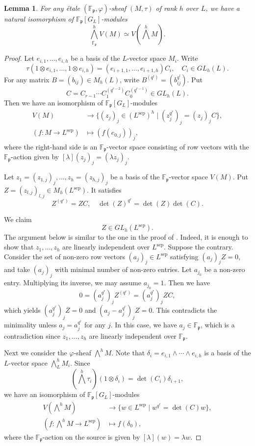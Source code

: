 \documentclass[10pt]{amsart}
\theoremstyle{plain}
\newtheorem{lem}[thm]{Lemma}
\theoremstyle{definition}
\newcommand{\sep}{\mathrm{sep}}
\newcommand{\bF}{\mathbb{F}}
\newcommand{\frp}{\mathfrak{p}}
\begin{document}
\begin{lem}\label{LemDetPhiMod}
	For any \'{e}tale $(\bF_\frp,\varphi)$-sheaf $(M,\tau)$ of rank $h$ over $L$,
	we have a natural isomorphism of $\bF_\frp[G_L]$-modules
	\[
	\bigwedge^h_{\bF_\frp} V(M)\simeq V(\bigwedge^h M).
	\]
\end{lem}
\begin{proof}
	Let $e_{i,1},\ldots, e_{i,h}$ be a basis of the $L$-vector space $M_i$. Write
	\[
	\tau(1\otimes e_{i,1},\ldots,1\otimes e_{i,h})=(e_{i+1,1},\ldots,e_{i+1,h})C_i,\quad C_i\in \mathit{GL}_h(L).
	\]
	For any matrix $B=(b_{ij})\in M_h(L)$, write 
	$B^{(q^l)}=(b_{ij}^{q^l})$.
	Put
	\[
	C= C_{r-1}\cdots C_1^{(q^{r-2})}C_0^{(q^{r-1})}\in\mathit{GL}_h(L).
	\]
	Then we have an isomorphism of $\bF_\frp[G_L]$-modules
	\[
	\begin{aligned}
		V(M)&\to \{(z_j)_j\in (L^\sep)^h\mid (z_j^{q^r})_j=(z_j)_j C\},\\
		(f:M\to L^\sep)&\mapsto (f(e_{0,j}))_j,
	\end{aligned}
	\]
	where the right-hand side is an $\bF_\frp$-vector space consisting of row vectors 
	with the $\bF_\frp$-action given by $[\lambda](z_j)_j=(\lambda z_j)_j$.
	
	
	
	Let $z_1=(z_{1,j})_j,\ldots,z_h=(z_{h,j})_j$ be a basis of the $\bF_\frp$-vector space $V(M)$. 
	Put $Z=(z_{l,j})_{l,j}\in M_h(L^\sep)$. It satisfies
	\[
	Z^{(q^r)}=Z C,\quad \det(Z)^{q^r}=\det(Z)\det(C).
	\]
	
	
	We claim
	\[
	Z\in\mathit{GL}_h(L^\sep).
	\]
	The argument below is similar to the one in the proof of \cite[Proposition A1.2.6]{Fon}. 
	Indeed, it is enough to show that $z_1,\ldots,z_h$ are linearly independent over $L^\sep$.
	Suppose the contrary. Consider the set of non-zero row vectors $(a_j)_j\in L^\sep$ satisfying $(a_j)_j Z=0$, and take $(a_j)_j$ with minimal number of 
	non-zero entries. Let $a_{j_0}$ be a non-zero entry. Multiplying its inverse, we may assume $a_{j_0}=1$. Then we have
	\[
	0=(a_j^{q^r})_j Z^{(q^r)}=(a_j^{q^r})_j Z C,
	\] 
	which yields $(a_j^{q^r})_j Z=0$ and $(a_j-a_j^{q^r})_j Z=0$. 
	This contradicts the minimality unless $a_j=a_j^{q^r}$ for any $j$.
	In this case, we have $a_j\in \bF_\frp$, which is a contradiction since $z_1,\ldots,z_h$ are linearly independent over $\bF_\frp$.
	
	Next we consider the $\varphi$-sheaf $\bigwedge^h M$. Note that $\delta_i=e_{i,1}\wedge\cdots \wedge e_{i,h}$
	is a basis of the $L$-vector space $\bigwedge^h_L M_i$. Since
	\[
	\left(\bigwedge^h\tau_{i}\right)(1\otimes \delta_i)=\det(C_i)\delta_{i+1},
	\] 
	we have an isomorphism of $\bF_\frp[G_L]$-modules
	\begin{equation}\label{EqnDetEquation}
	\begin{aligned}
		V(\bigwedge^h M)&\to \{w\in L^\sep\mid w^{q^r}=\det(C)w\},\\
		(f:\bigwedge^h M\to L^\sep)&\mapsto f(\delta_0),
	\end{aligned}
	\end{equation}
	where the $\bF_\frp$-action on the source is given by $[\lambda](w)=\lambda w$.
	

\end{proof}
\end{document}
